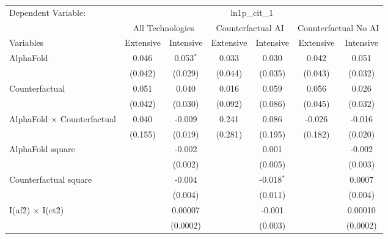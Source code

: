 \begingroup
\centering
\begin{tabular}{lcccccc}
   \tabularnewline \midrule \midrule
   Dependent Variable: & \multicolumn{6}{c}{ln1p\_cit\_1}\\
 & \multicolumn{2}{c}{All Technologies} & \multicolumn{2}{c}{Counterfactual AI} & \multicolumn{2}{c}{Counterfactual No AI} \\
\cmidrule(lr){1-1}\cmidrule(lr){2-3} \cmidrule(lr){4-5} \cmidrule(lr){6-7}
Variables & \multicolumn{1}{c}{Extensive} & \multicolumn{1}{c}{Intensive} & \multicolumn{1}{c}{Extensive} & \multicolumn{1}{c}{Intensive} & \multicolumn{1}{c}{Extensive} & \multicolumn{1}{c}{Intensive} \\
\cmidrule(lr){1-1}\cmidrule(lr){2-2} \cmidrule(lr){3-3} \cmidrule(lr){4-4} \cmidrule(lr){5-5} \cmidrule(lr){6-6} \cmidrule(lr){7-7}
   AlphaFold                          & 0.046   & 0.053$^{*}$ & 0.033   & 0.030        & 0.042   & 0.051\\   
                                      & (0.042) & (0.029)     & (0.044) & (0.035)      & (0.043) & (0.032)\\   
   Counterfactual                     & 0.051   & 0.040       & 0.016   & 0.059        & 0.056   & 0.026\\   
                                      & (0.042) & (0.030)     & (0.092) & (0.086)      & (0.045) & (0.032)\\   
   AlphaFold $\times$ Counterfactual  & 0.040   & -0.009      & 0.241   & 0.086        & -0.026  & -0.016\\   
                                      & (0.155) & (0.019)     & (0.281) & (0.195)      & (0.182) & (0.020)\\   
   AlphaFold square                   &         & -0.002      &         & 0.001        &         & -0.002\\   
                                      &         & (0.002)     &         & (0.005)      &         & (0.003)\\   
   Counterfactual square              &         & -0.004      &         & -0.018$^{*}$ &         & 0.0007\\   
                                      &         & (0.004)     &         & (0.011)      &         & (0.004)\\   
   I(af\^2) $\times$ I(ct\^2)         &         & 0.00007     &         & -0.001       &         & 0.00010\\   
                                      &         & (0.0002)    &         & (0.003)      &         & (0.0002)\\   

\end{tabular}
